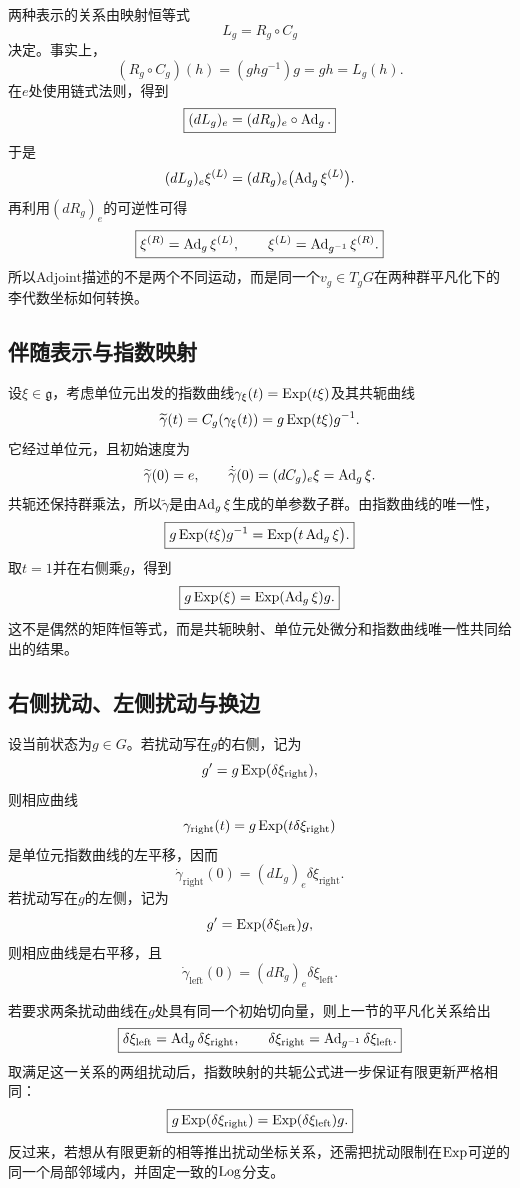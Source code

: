两种表示的关系由映射恒等式
\[
    L_g=R_g\circ C_g
\]
决定。事实上，
\[
    (R_g\circ C_g)(h)=(ghg^{-1})g=gh=L_g(h).
\]
在$e$处使用链式法则，得到
\[
    \boxed{
    (dL_g)_e=(dR_g)_e\circ\operatorname{Ad}_g.
    }
\]
于是
\[
    (dL_g)_e\xi^{(L)}
    =(dR_g)_e\bigl(\operatorname{Ad}_g\xi^{(L)}\bigr).
\]
再利用$(dR_g)_e$的可逆性可得
\[
    \boxed{
    \xi^{(R)}=\operatorname{Ad}_g\xi^{(L)},
    \qquad
    \xi^{(L)}=\operatorname{Ad}_{g^{-1}}\xi^{(R)}.
    }
\]
所以Adjoint描述的不是两个不同运动，而是同一个$v_g\in T_gG$在两种群平凡化下的李代数坐标如何转换。

\subsection{伴随表示与指数映射}

设$\xi\in\mathfrak g$，考虑单位元出发的指数曲线$\gamma_\xi(t)=\operatorname{Exp}(t\xi)$及其共轭曲线
\[
    \widetilde\gamma(t)
    =C_g(\gamma_\xi(t))
    =g\operatorname{Exp}(t\xi)g^{-1}.
\]
它经过单位元，且初始速度为
\[
    \widetilde\gamma(0)=e,
    \qquad
    \dot{\widetilde\gamma}(0)
    =(dC_g)_e\xi
    =\operatorname{Ad}_g\xi.
\]
共轭还保持群乘法，所以$\widetilde\gamma$是由$\operatorname{Ad}_g\xi$生成的单参数子群。由指数曲线的唯一性，
\[
    \boxed{
    g\operatorname{Exp}(t\xi)g^{-1}
    =\operatorname{Exp}\bigl(t\operatorname{Ad}_g\xi\bigr).
    }
\]
取$t=1$并在右侧乘$g$，得到
\[
    \boxed{
    g\operatorname{Exp}(\xi)
    =\operatorname{Exp}(\operatorname{Ad}_g\xi)g.
    }
\]
这不是偶然的矩阵恒等式，而是共轭映射、单位元处微分和指数曲线唯一性共同给出的结果。

\subsection{右侧扰动、左侧扰动与换边}

设当前状态为$g\in G$。若扰动写在$g$的右侧，记为
\[
    g'=g\operatorname{Exp}(\delta\xi_{\mathrm{right}}),
\]
则相应曲线
\[
    \gamma_{\mathrm{right}}(t)
    =g\operatorname{Exp}(t\delta\xi_{\mathrm{right}})
\]
是单位元指数曲线的左平移，因而
\[
    \dot\gamma_{\mathrm{right}}(0)
    =(dL_g)_e\delta\xi_{\mathrm{right}}.
\]
若扰动写在$g$的左侧，记为
\[
    g'=\operatorname{Exp}(\delta\xi_{\mathrm{left}})g,
\]
则相应曲线是右平移，且
\[
    \dot\gamma_{\mathrm{left}}(0)
    =(dR_g)_e\delta\xi_{\mathrm{left}}.
\]

若要求两条扰动曲线在$g$处具有同一个初始切向量，则上一节的平凡化关系给出
\[
    \boxed{
    \delta\xi_{\mathrm{left}}
    =\operatorname{Ad}_g\delta\xi_{\mathrm{right}},
    \qquad
    \delta\xi_{\mathrm{right}}
    =\operatorname{Ad}_{g^{-1}}\delta\xi_{\mathrm{left}}.
    }
\]
取满足这一关系的两组扰动后，指数映射的共轭公式进一步保证有限更新严格相同：
\[
    \boxed{
    g\operatorname{Exp}(\delta\xi_{\mathrm{right}})
    =\operatorname{Exp}(\delta\xi_{\mathrm{left}})g.
    }
\]
反过来，若想从有限更新的相等推出扰动坐标关系，还需把扰动限制在$\operatorname{Exp}$可逆的同一个局部邻域内，并固定一致的$\operatorname{Log}$分支。

